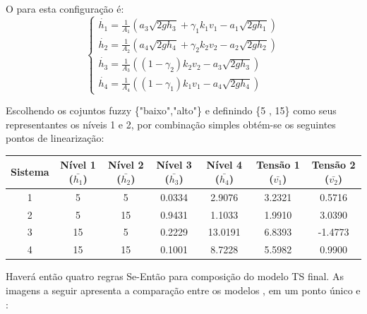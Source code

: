 O  para esta configuração é:
\begin{equation}
\begin{cases}
\dot{h_{1}} = \frac{1}{A_{1}}(a_{3}\sqrt{2gh_{3}} + \gamma_{1}k_{1}v_{1} - a_{1}\sqrt{2gh_{1}})\\

\dot{h_{2}} = \frac{1}{A_{2}}(a_{4}\sqrt{2gh_{4}} + \gamma_{2}k_{2}v_{2} - a_{2}\sqrt{2gh_{2}})\\

\dot{h_{3}} = \frac{1}{A_{3}}((1 - \gamma_{2})k_{2}v_{2} - a_{3}\sqrt{2gh_{3}})\\

\dot{h_{4}} = \frac{1}{A_{4}}((1 - \gamma_{1})k_{1}v_{1} - a_{4}\sqrt{2gh_{4}})
\end{cases}
\label{eqFMNL}
\end{equation}

Escolhendo os cojuntos fuzzy \{"baixo","alto"\} e definindo \{5 , 15\} como seus representantes os níveis 1 e 2, por combinação simples obtém-se os seguintes pontos de linearização:
\begin{center}
	\begin{tabular}{|c|c|c|c|c|c|c|}
		\hline
		Sistema & Nível 1 ($\bar{h_1}$) & Nível 2 ($\bar{h_2}$) & Nível 3 ($\bar{h_3}$) & Nível 4 ($\bar{h_4}$) & Tensão 1 ($\bar{v_1}$) & Tensão 2 ($\bar{v_2}$) \\ \hline
		1 & 5 & 5 & 0.0334 & 2.9076 & 3.2321 & 0.5716 \\ \hline
		2 & 5 & 15 & 0.9431 & 1.1033 & 1.9910 & 3.0390 \\ \hline
		3 & 15 & 5 & 0.2229 & 13.0191 & 6.8393 & -1.4773 \\ \hline
		4 & 15 & 15 & 0.1001 & 8.7228 & 5.5982 & 0.9900 \\	\hline
	\end{tabular}
\end{center}

Haverá então quatro regras Se-Então para composição do modelo TS final. As imagens a seguir apresenta a comparação entre os modelos ,  em um ponto único e :

